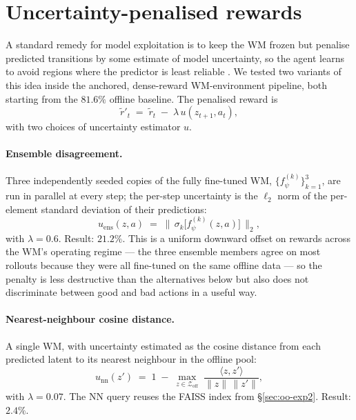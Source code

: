 \section{Uncertainty-penalised rewards}
\label{sec:oo-exp45}

A standard remedy for model exploitation is to keep the WM frozen but penalise predicted transitions by some estimate of model uncertainty, so the agent learns to avoid regions where the predictor is least reliable \cite{yu2020mopomodelbasedofflinepolicy, yu2021combo}. We tested two variants of this idea inside the anchored, dense-reward WM-environment pipeline, both starting from the $81.6\%$ offline baseline. The penalised reward is
\begin{equation}
    \tilde r'_t \;=\; \tilde r_t \;-\; \lambda\, u(z_{t+1}, a_t),
    \label{eq:oo-mopo-reward}
\end{equation}
with two choices of uncertainty estimator $u$.

\paragraph{Ensemble disagreement.} Three independently seeded copies of the fully fine-tuned WM, $\{f_\psi^{(k)}\}_{k=1}^3$, are run in parallel at every step; the per-step uncertainty is the $\ell_2$ norm of the per-element standard deviation of their predictions:
\begin{equation}
    u_{\text{ens}}(z, a) \;=\; \Big\|\,\sigma_k\!\big[f_\psi^{(k)}(z, a)\big]\,\Big\|_2,
    \label{eq:oo-mopo-ens}
\end{equation}
with $\lambda = 0.6$. Result: $21.2\%$. This is a uniform downward offset on rewards across the WM's operating regime --- the three ensemble members agree on most rollouts because they were all fine-tuned on the same offline data --- so the penalty is less destructive than the alternatives below but also does not discriminate between good and bad actions in a useful way.

\paragraph{Nearest-neighbour cosine distance.} A single WM, with uncertainty estimated as the cosine distance from each predicted latent to its nearest neighbour in the offline pool:
\begin{equation}
    u_{\text{nn}}(z') \;=\; 1 \;-\; \max_{z\in\mathcal{Z}_{\text{off}}}\;
        \frac{\langle z, z'\rangle}{\|z\|\,\|z'\|},
    \label{eq:oo-mopo-nn}
\end{equation}
with $\lambda = 0.07$. The NN query reuses the FAISS index from \S\ref{sec:oo-exp2}. Result: $2.4\%$.

